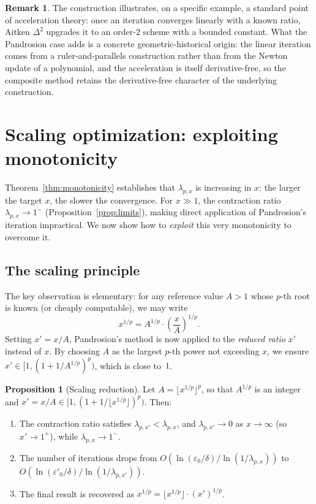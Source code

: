 \documentclass[11pt,a4paper]{article}
\theoremstyle{definition}
\newtheorem{proposition}{Proposition}[section]
\newtheorem{remark}{Remark}[section]
\newcommand{\eps}{\varepsilon}
\begin{document}
\begin{remark}
The construction illustrates, on a specific example, a standard point of acceleration theory: once an iteration converges linearly with a known ratio, Aitken $\Delta^2$ upgrades it to an order-$2$ scheme with a bounded constant. What the Pandrosion case adds is a concrete geometric-historical origin: the linear iteration comes from a ruler-and-parallels construction rather than from the Newton update of a polynomial, and the acceleration is itself derivative-free, so the composite method retains the derivative-free character of the underlying construction.
\end{remark}

\section{Scaling optimization: exploiting monotonicity}
\label{sec:scaling}

Theorem~\ref{thm:monotonicity} establishes that $\lambda_{p,x}$ is increasing in $x$: the larger the target $x$, the slower the convergence. For $x \gg 1$, the contraction ratio $\lambda_{p,x} \to 1^-$ (Proposition~\ref{prop:limits}), making direct application of Pandrosion's iteration impractical. We now show how to \emph{exploit} this very monotonicity to overcome it.

\subsection{The scaling principle}

The key observation is elementary: for any reference value $A > 1$ whose $p$-th root is known (or cheaply computable), we may write
\begin{equation}
  \label{eq:scaling}
  x^{1/p} = A^{1/p} \cdot \left(\frac{x}{A}\right)^{\!1/p}.
\end{equation}
Setting $x' = x/A$, Pandrosion's method is now applied to the \emph{reduced ratio} $x'$ instead of $x$. By choosing $A$ as the largest $p$-th power not exceeding $x$, we ensure $x' \in [1, (1+1/A^{1/p})^p)$, which is close to~$1$.

\begin{proposition}[Scaling reduction]
\label{prop:scaling}
Let $A = \lfloor x^{1/p} \rfloor^p$, so that $A^{1/p}$ is an integer and $x' = x/A \in [1, (1+1/\lfloor x^{1/p}\rfloor)^p)$. Then:
\begin{enumerate}
  \item The contraction ratio satisfies $\lambda_{p,x'} < \lambda_{p,x}$, and $\lambda_{p,x'} \to 0$ as $x \to \infty$ (so $x' \to 1^+$), while $\lambda_{p,x} \to 1^-$.
  \item The number of iterations drops from $O(\ln(\eps_0/\delta) / \ln(1/\lambda_{p,x}))$ to $O(\ln(\eps'_0/\delta) / \ln(1/\lambda_{p,x'}))$.
  \item The final result is recovered as $x^{1/p} = \lfloor x^{1/p} \rfloor \cdot (x')^{1/p}$.
\end{enumerate}
\end{proposition}
\end{document}
